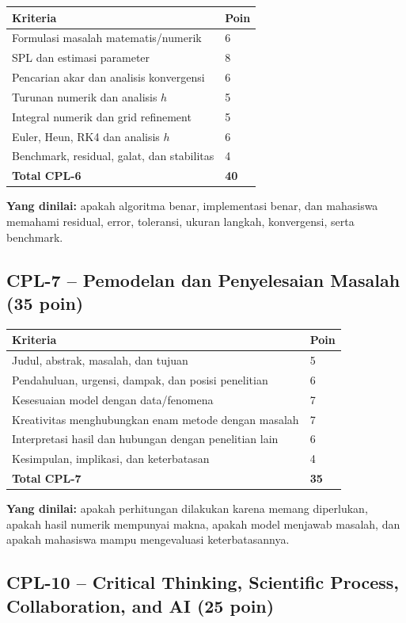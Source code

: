 \documentclass[11pt,a4paper]{article}
\begin{document}
\begin{tabularx}{\textwidth}{Y C{1.5cm}}
\toprule
\textbf{Kriteria} & \textbf{Poin} \\
\midrule
Formulasi masalah matematis/numerik & 6 \\
SPL dan estimasi parameter & 8 \\
Pencarian akar dan analisis konvergensi & 6 \\
Turunan numerik dan analisis $h$ & 5 \\
Integral numerik dan grid refinement & 5 \\
Euler, Heun, RK4 dan analisis $h$ & 6 \\
Benchmark, residual, galat, dan stabilitas & 4 \\
\midrule
\textbf{Total CPL-6} & \textbf{40} \\
\bottomrule
\end{tabularx}

\textbf{Yang dinilai:} apakah algoritma benar, implementasi benar, dan mahasiswa memahami residual, error, toleransi, ukuran langkah, konvergensi, serta benchmark.

\subsection{CPL-7 -- Pemodelan dan Penyelesaian Masalah (35 poin)}

\begin{tabularx}{\textwidth}{Y C{1.5cm}}
\toprule
\textbf{Kriteria} & \textbf{Poin} \\
\midrule
Judul, abstrak, masalah, dan tujuan & 5 \\
Pendahuluan, urgensi, dampak, dan posisi penelitian & 6 \\
Kesesuaian model dengan data/fenomena & 7 \\
Kreativitas menghubungkan enam metode dengan masalah & 7 \\
Interpretasi hasil dan hubungan dengan penelitian lain & 6 \\
Kesimpulan, implikasi, dan keterbatasan & 4 \\
\midrule
\textbf{Total CPL-7} & \textbf{35} \\
\bottomrule
\end{tabularx}

\textbf{Yang dinilai:} apakah perhitungan dilakukan karena memang diperlukan, apakah hasil numerik mempunyai makna, apakah model menjawab masalah, dan apakah mahasiswa mampu mengevaluasi keterbatasannya.

\subsection{CPL-10 -- Critical Thinking, Scientific Process, Collaboration, and AI (25 poin)}
\end{document}
